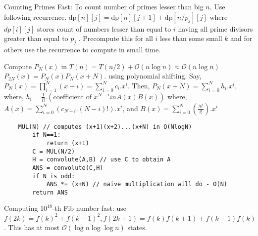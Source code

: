 Counting Primes Fast:  To count number of primes lesser than big $n$. Use following recurrence.
$\text{dp}[n][j] =\text{dp}[n][j + 1] + \text{dp}[n/p_j][j]$ where $dp[i][j]$ stores count of numbers lesser than equal to $i$
having all prime divisors greater than equal to $p_j$ . Precompute this for all $i$ less than some small $k$
and for others use the recurrence to compute in small time.

Compute $P_N(x)$ in $T(n)=T(n/2)+\mathcal{O}(n\log n)\approx \mathcal{O}(n\log n)$ $P_{2N}(x) = P_{N}(x)P_{N}(x+N)$. using polynomial shifting. Say, $P_N(x) = \prod \limits_{i=1}^N (x+i) = \sum_{i=0}^N c_i.x^i$.
Then, $P_N(x+N) = \sum_{i=0}^N h_i.x^i$, where, $h_i = \frac{1}{i!} . (\text{coefficient of } x^{N-i} in A(x)B(x))$ where, $A(x) = \sum \limits_{i=0}^{N} (c_{N-i}.(N-i)!) . x^i$, and $B(x) = \sum \limits_{i=0}^{N} \left( \frac {N^i}{i!} \right) . x^i$

\begin{verbatim}
    MUL(N) // computes (x+1)(x+2)...(x+N) in O(NlogN)
        if N==1:
            return (x+1)
        C = MUL(N/2)
        H = convolute(A,B) // use C to obtain A
        ANS = convolute(C,H)
        if N is odd:
            ANS *= (x+N) // naive multiplication will do - O(N)
        return ANS
\end{verbatim}

Computing $10^{18}$-th Fib number fast: use $f(2k) = f(k)^2 + f(k - 1)^2, f(2k + 1) = f(k)f(k + 1) + f(k - 1)f(k)$. This has at most $\mathcal{O}(\log n\log\log n)$ states.